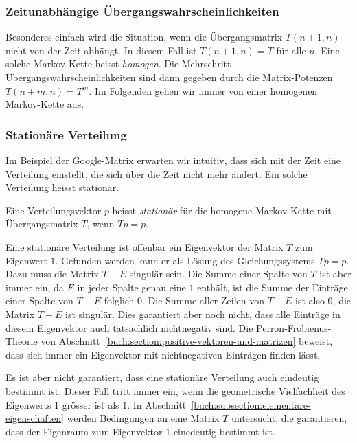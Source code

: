 \subsubsection{Zeitunabhängige Übergangswahrscheinlichkeiten}
Besonderes einfach wird die Situation, wenn die Übergangsmatrix $T(n+1,n)$
nicht von der Zeit abhängt.
In diesem Fall ist $T(n+1,n) = T$ für alle $n$.
Eine solche Markov-Kette heisst {\em homogen}.
%
Die Mehrschritt-Übergangswahrscheinlichkeiten sind dann gegeben
durch die Matrix-Potenzen $T(n+m,n)=T^m$.
Im Folgenden gehen wir immer von einer homogenen Markov-Kette aus.

\subsubsection{Stationäre Verteilung}
Im Beispiel der Google-Matrix erwarten wir intuitiv, dass sich mit
der Zeit eine Verteilung einstellt,  die sich über die Zeit nicht
mehr ändert.
Ein solche Verteilung heisst stationär.

\begin{definition}
Eine Verteilungsvektor $p$ heisst {\em stationär} für die
homogene Markov-Kette mit Übergangsmatrix $T$, wenn $Tp=p$.
%
\end{definition}

Eine stationäre Verteilung ist offenbar ein Eigenvektor der Matrix
$T$  zum Eigenwert $1$.
Gefunden werden kann er als Lösung des Gleichungssystems $Tp=p$.
Dazu muss die Matrix $T-E$ singulär sein.
Die Summe einer Spalte von $T$ ist aber immer ein, da $E$ in jeder Spalte
genau eine $1$ enthält, ist die Summe der Einträge einer Spalte von
$T-E$ folglich $0$.
Die Summe aller Zeilen von $T-E$ ist also $0$, die Matrix $T-E$ 
ist singulär.
Dies garantiert aber noch nicht, dass alle Einträge in diesem
Eigenvektor auch tatsächlich nichtnegativ sind.
Die Perron-Frobienus-Theorie von
Abschnitt~\ref{buch:section:positive-vektoren-und-matrizen}
beweist, dass sich immer ein Eigenvektor mit nichtnegativen
Einträgen finden lässt.

Es ist aber nicht garantiert, dass eine stationäre Verteilung
auch eindeutig bestimmt ist.
Dieser Fall tritt immer ein, wenn die geometrische Vielfachheit
des Eigenwerts $1$ grösser ist als $1$.
In Abschnitt~\ref{buch:subsection:elementare-eigenschaften}
werden Bedingungen an eine Matrix $T$ untersucht, die garantieren,
dass der Eigenraum zum Eigenvektor $1$ einedeutig bestimmt ist.

